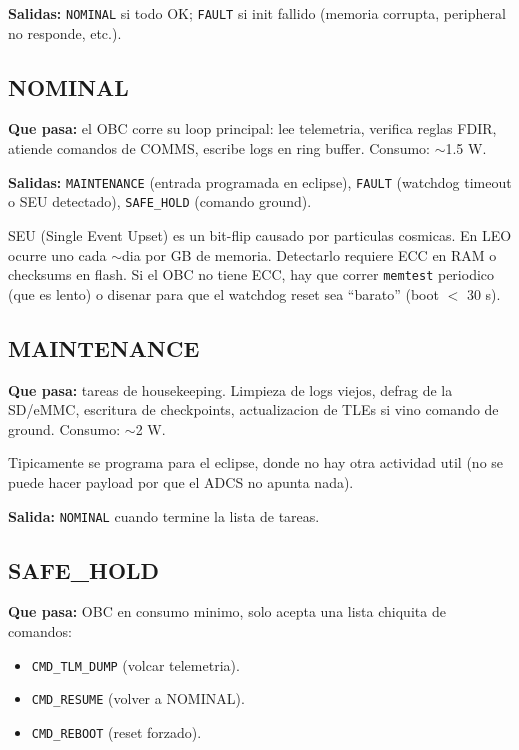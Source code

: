 \documentclass[11pt,a4paper,oneside,openright]{book}
\begin{document}
\textbf{Salidas:} \texttt{NOMINAL} si todo OK; \texttt{FAULT} si
init fallido (memoria corrupta, peripheral no responde, etc.).

\subsection*{NOMINAL}

\textbf{Que pasa:} el OBC corre su loop principal: lee telemetria,
verifica reglas FDIR, atiende comandos de COMMS, escribe logs en
ring buffer. Consumo: $\sim$1.5 W.

\textbf{Salidas:} \texttt{MAINTENANCE} (entrada programada en
eclipse), \texttt{FAULT} (watchdog timeout o SEU detectado),
\texttt{SAFE\_HOLD} (comando ground).

\begin{tecnico}
SEU (Single Event Upset) es un bit-flip causado por particulas
cosmicas. En LEO ocurre uno cada $\sim$dia por GB de memoria.
Detectarlo requiere ECC en RAM o checksums en flash. Si el OBC no
tiene ECC, hay que correr \texttt{memtest} periodico (que es lento)
o disenar para que el watchdog reset sea ``barato'' (boot $<$ 30 s).
\end{tecnico}

\subsection*{MAINTENANCE}

\textbf{Que pasa:} tareas de housekeeping. Limpieza de logs viejos,
defrag de la SD/eMMC, escritura de checkpoints, actualizacion de TLEs
si vino comando de ground. Consumo: $\sim$2 W.

Tipicamente se programa para el eclipse, donde no hay otra actividad
util (no se puede hacer payload por que el ADCS no apunta nada).

\textbf{Salida:} \texttt{NOMINAL} cuando termine la lista de tareas.

\subsection*{SAFE\_HOLD}

\textbf{Que pasa:} OBC en consumo minimo, solo acepta una lista
chiquita de comandos:

\begin{itemize}[leftmargin=2em]
  \item \texttt{CMD\_TLM\_DUMP} (volcar telemetria).
  \item \texttt{CMD\_RESUME} (volver a NOMINAL).
  \item \texttt{CMD\_REBOOT} (reset forzado).
\end{itemize}
\end{document}
